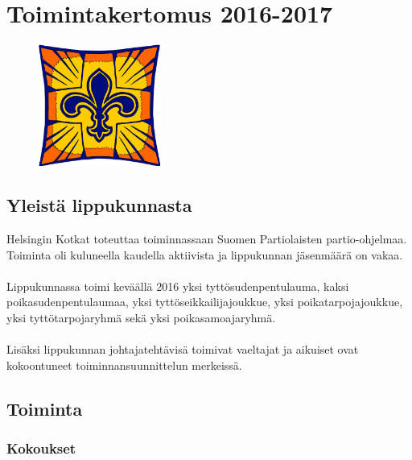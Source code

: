 \documentclass[a4paper, 12pt, finnish]{report} %
\begin{document}
\chapter{Toimintakertomus 2016-2017}

\begin{figure}[htb]
	\begin{center}
	\includegraphics[height=4cm]{heko.png}
	\end{center}
\end{figure}


\section{Yleistä lippukunnasta}
Helsingin Kotkat toteuttaa toiminnassaan Suomen Partiolaisten partio-ohjelmaa. Toiminta oli kuluneella kaudella aktiivista ja lippukunnan jäsenmäärä on vakaa.\\
\\Lippukunnassa toimi keväällä 2016 yksi tyttösudenpentulauma, kaksi poikasudenpentulaumaa, yksi tyttöseikkailijajoukkue, yksi poikatarpojajoukkue, yksi tyttötarpojaryhmä sekä yksi poikasamoajaryhmä.\\
\\Lisäksi lippukunnan johtajatehtävisä toimivat vaeltajat ja aikuiset ovat kokoontuneet toiminnansuunnittelun merkeissä.
\newpage
\section{Toiminta}
\subsection{Kokoukset}
\end{document}
